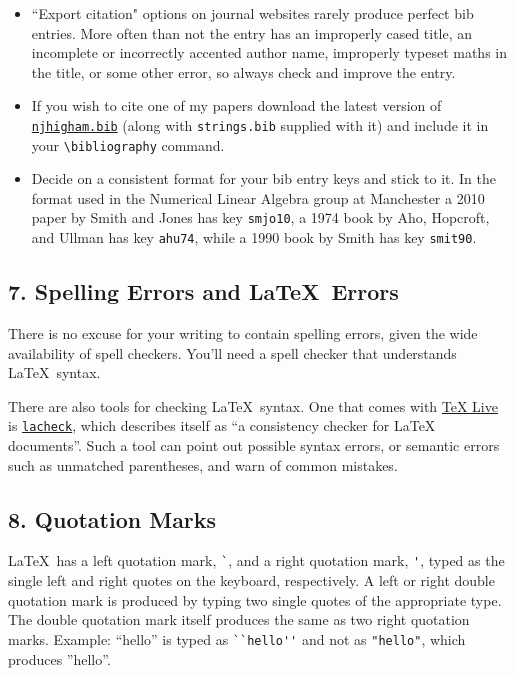 \documentclass[12pt]{extarticle}
\begin{document}
\begin{itemize}
\item ``Export citation" options on journal websites rarely produce perfect bib
entries.  More often than not the entry has an improperly cased title,
an incomplete or incorrectly accented author name, improperly typeset
maths in the title, or some other error, so always check and improve
the entry.

\item If you wish to cite one of my papers download the latest version of
\href{https://github.com/higham/njhigham-bib}{\texttt{njhigham.bib}} (along with \texttt{strings.bib} supplied with it) and include it in
your \texttt{\textbackslash{}bibliography} command.

\item Decide on a consistent format for your bib entry keys and stick to it. 
In the format used in the Numerical Linear Algebra group at Manchester a
2010 paper by Smith and Jones has key \texttt{smjo10}, a 1974 book by Aho,
Hopcroft, and Ullman has key \texttt{ahu74}, while a 1990 book by Smith has key
\texttt{smit90}.
\end{itemize}

\subsection*{7. Spelling Errors and \LaTeX\ Errors}
\label{sec-1-7}
There is no excuse for your writing to contain spelling errors, given the
wide availability of spell checkers.  You'll need a spell checker that
understands \LaTeX\ syntax.

There are also tools for checking \LaTeX\ syntax.
One that comes with \href{https://www.tug.org/texlive/}{\TeX{} Live} is \href{https://www.ctan.org/tex-archive/support/lacheck?lang=en}{\texttt{lacheck}}, which describes itself as 
``a consistency checker for \LaTeX{} documents''.
Such a tool can point out possible syntax errors, or semantic errors
such as unmatched parentheses, and warn of common mistakes.

\subsection*{8. Quotation Marks}
\label{sec-1-8}
\LaTeX\ has a left quotation mark, \verb"`", and 
a right quotation mark, \verb"'", typed as the single left and right quotes on the
keyboard, respectively.
A left or right double quotation mark is produced by typing two single
quotes of the appropriate type.
The double quotation mark itself produces the same as two right quotation marks.
Example: ``hello'' is typed as \verb!``hello''! and not as
\verb!"hello"!, which produces ''hello''.
\end{document}
